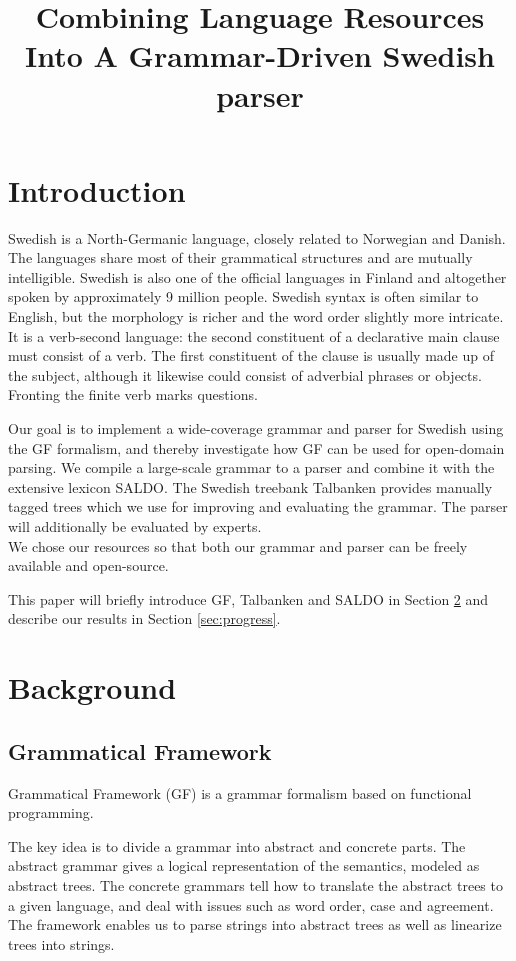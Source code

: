 \documentclass[10pt, a4paper]{article}
\title{Combining Language Resources Into A Grammar-Driven Swedish parser}
\begin{document}
\maketitleabstract


\section{Introduction}
Swedish is a North-Germanic language,
closely related to Norwegian and Danish. The languages share most of their
grammatical structures and are mutually intelligible. Swedish is also 
one of the official languages in Finland and altogether spoken by approximately 9
million people.
Swedish syntax is often similar to English, but the  morphology is richer and the
word order slightly more intricate.
It is a verb-second language: the second constituent of a declarative main
clause must consist of a verb.
The first constituent of the clause is usually made up of the subject,
although it likewise could consist of adverbial phrases or objects.
Fronting the finite verb marks questions.

Our goal is to implement a wide-coverage grammar and parser for Swedish
using the GF formalism, and 
thereby investigate how GF can be used for open-domain parsing.
We compile a large-scale grammar to a parser
and combine it with the extensive lexicon SALDO. The Swedish treebank 
Talbanken provides manually tagged trees which we use for improving and evaluating
the grammar. The parser will additionally
be evaluated by experts. \\
We chose our resources so that both our grammar and parser can 
be freely available and open-source. 

This paper will briefly introduce GF, Talbanken and SALDO in Section \ref{sec:background}
and describe our results in Section \ref{sec:progress}.

\section{Background}
\label{sec:background}
\subsection{Grammatical Framework}
\label{sec:gf}


Grammatical Framework \cite{ranta-2011} (GF) is a grammar formalism based on
functional programming. 

The key idea is to divide a grammar into abstract and concrete parts. 
The abstract grammar gives a logical representation of the semantics,
modeled as abstract trees.
The concrete grammars tell how to translate the abstract trees to a given language,
and deal with issues such as word order, case and agreement. 
The framework enables us to parse strings into abstract trees as well as
linearize trees into strings.
\end{document}
